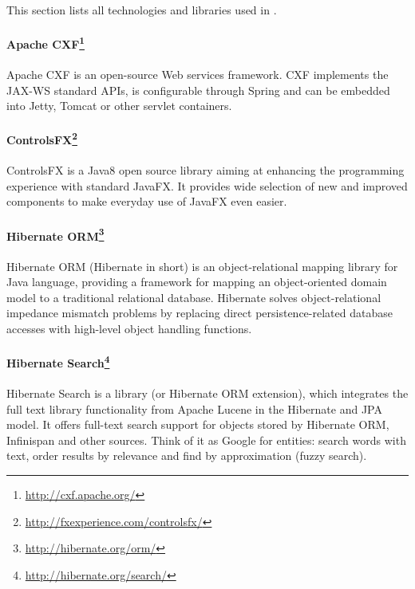 
\label{sec:UsedTechnologies}

This section lists all technologies and libraries used in \textan{}.

\paragraph{Apache CXF\footnote{\url{http://cxf.apache.org/}}}
Apache CXF is an open-source Web services framework. CXF implements the JAX-WS
standard APIs, is configurable through Spring and can be embedded into Jetty,
Tomcat or other servlet containers.

\paragraph{ControlsFX\footnote{\url{http://fxexperience.com/controlsfx/}}}
ControlsFX is a Java8 open source library aiming at enhancing the programming
experience with standard JavaFX. It provides wide selection of new and improved
components to make everyday use of JavaFX even easier.

\paragraph{Hibernate ORM\footnote{\url{http://hibernate.org/orm/}}}
Hibernate ORM (Hibernate in short) is an object-relational mapping library for
Java language, providing a framework for mapping an object-oriented domain
model to a traditional relational database. Hibernate solves object-relational
im\-pedance mismatch problems by replacing direct persistence-related database
accesses with high-level object handling functions.

\paragraph{Hibernate Search\footnote{\url{http://hibernate.org/search/}}}
Hibernate Search is a library (or Hibernate ORM extension), which integrates
the full text library functionality from Apache Lucene in the Hibernate and
JPA model. It offers full-text search support for objects stored by Hibernate
ORM, Infinispan and other sources. Think of it as Google\texttrademark{} for
entities: search words with text, order results by relevance and find by
approximation (fuzzy search).

